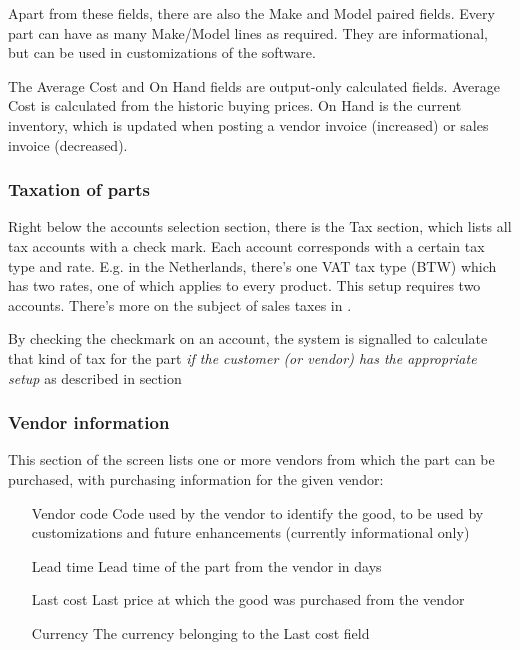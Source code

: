 Apart from these fields, there are also the Make and Model paired fields. Every part
can have as many Make/Model lines as required. They are informational, but can be used
in customizations of the software.

The Average Cost and On Hand fields are output-only calculated fields. Average Cost is
calculated from the historic buying prices. On Hand is the current inventory, which is
updated when posting a vendor invoice (increased) or sales invoice (decreased).



\subsubsection{Taxation of parts}
\label{subsec-parts-taxation}

Right below the accounts selection section, there is the Tax section, which lists
all tax accounts with a check mark. Each account corresponds with a certain tax type
and rate. E.g. in the Netherlands, there's one VAT tax type (BTW) which has two rates,
one of which applies to every product. This setup requires two accounts. There's more
on the subject of sales taxes in .

By checking the checkmark on an account, the system is signalled to calculate that
kind of tax for the part {\it if the customer (or vendor) has the appropriate setup}
as described in section


\subsubsection{Vendor information}

This section of the screen lists one or more vendors from which the part can be
purchased, with purchasing information for the given vendor:

\begin{itemize}
\item [Vendor code] Code used by the vendor to identify the good, to be used by
    customizations and future enhancements (currently informational only)
\item [Lead time] Lead time of the part from the vendor in days
\item [Last cost] Last price at which the good was purchased from the vendor
\item [Currency] The currency belonging to the Last cost field
\end{itemize}


